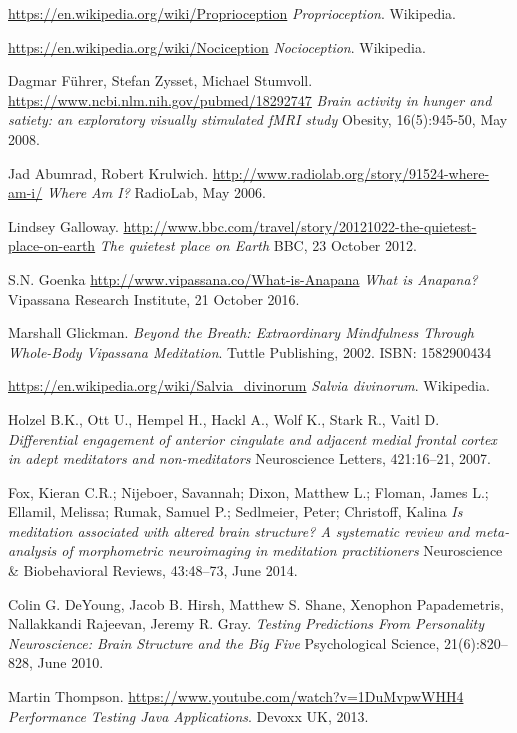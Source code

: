 \documentclass{article}
\begin{document}
\begin{thebibliography}{9}
  \url{https://en.wikipedia.org/wiki/Proprioception}
  \textit{Proprioception}.
  Wikipedia.

  \url{https://en.wikipedia.org/wiki/Nociception}
  \textit{Nocioception}.
  Wikipedia.

  Dagmar Führer, Stefan Zysset, Michael Stumvoll.
  \url{https://www.ncbi.nlm.nih.gov/pubmed/18292747}
  \textit{Brain activity in hunger and satiety: an exploratory visually stimulated fMRI study}
  Obesity, 16(5):945-50, May 2008.

  Jad Abumrad, Robert Krulwich.
  \url{http://www.radiolab.org/story/91524-where-am-i/}
  \textit{Where Am I?}
  RadioLab, May 2006.

  Lindsey Galloway.
  \url{http://www.bbc.com/travel/story/20121022-the-quietest-place-on-earth}
  \textit{The quietest place on Earth}
  BBC, 23 October 2012.

  S.N. Goenka
  \url{http://www.vipassana.co/What-is-Anapana}
  \textit{What is Anapana?}
  Vipassana Research Institute, 21 October 2016.

  Marshall Glickman.
  \textit{Beyond the Breath: Extraordinary Mindfulness Through Whole-Body Vipassana Meditation}.
  Tuttle Publishing, 2002.
  ISBN: 1582900434

  \url{https://en.wikipedia.org/wiki/Salvia_divinorum}
  \textit{Salvia divinorum}.
  Wikipedia.

  Holzel B.K., Ott U., Hempel H., Hackl A., Wolf K., Stark R., Vaitl D.
  \textit{Differential engagement of anterior cingulate and adjacent medial frontal cortex in adept meditators and non-meditators}
  Neuroscience Letters, 421:16–21, 2007.

  Fox, Kieran C.R.; Nijeboer, Savannah; Dixon, Matthew L.; Floman, James L.; Ellamil, Melissa; Rumak, Samuel P.; Sedlmeier, Peter; Christoff, Kalina
  \textit{Is meditation associated with altered brain structure? A systematic review and meta-analysis of morphometric neuroimaging in meditation practitioners}
  Neuroscience \& Biobehavioral Reviews, 43:48–73, June 2014.

  Colin G. DeYoung, Jacob B. Hirsh, Matthew S. Shane, Xenophon Papademetris, Nallakkandi Rajeevan, Jeremy R. Gray.
  \textit{Testing Predictions From Personality Neuroscience: Brain Structure and the Big Five}
  Psychological Science, 21(6):820–828, June 2010.

  Martin Thompson.
  \url{https://www.youtube.com/watch?v=1DuMvpwWHH4}
  \textit{Performance Testing Java Applications}.
  Devoxx UK, 2013.

\end{thebibliography}
\end{document}
